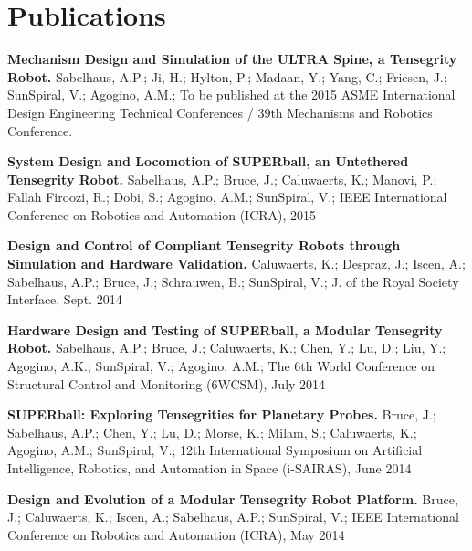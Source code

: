 \documentclass[letterpaper]{deedy-resume} %
\begin{document}
\begin{minipage}[t]{0.66\textwidth}%
\section{Publications}

\vspace{0.4cm}

\begin{tightitemize}

\item \textbf{Mechanism Design and Simulation of the ULTRA Spine, a Tensegrity Robot.} Sabelhaus, A.P.; Ji, H.; Hylton, P.; Madaan, Y.; Yang, C.; Friesen, J.; SunSpiral, V.; Agogino, A.M.; To be published at the 2015 ASME International Design Engineering Technical Conferences / 39th Mechanisms and Robotics Conference.

\item \textbf{System Design and Locomotion of SUPERball, an Untethered Tensegrity Robot.} Sabelhaus, A.P.; Bruce, J.; Caluwaerts, K.; Manovi, P.; Fallah Firoozi, R.; Dobi, S.; Agogino, A.M.; SunSpiral, V.; IEEE International Conference on Robotics and Automation (ICRA), 2015

\item \textbf{Design and Control of Compliant Tensegrity Robots through Simulation and Hardware Validation.} Caluwaerts, K.; Despraz, J.; Iscen, A.; Sabelhaus, A.P.; Bruce, J.; Schrauwen, B.; SunSpiral, V.;  J. of the Royal Society Interface, Sept. 2014

\item \textbf{Hardware Design and Testing of SUPERball, a Modular Tensegrity Robot.} Sabelhaus, A.P.; Bruce, J.; Caluwaerts, K.; Chen, Y.; Lu, D.; Liu, Y.; Agogino, A.K.; SunSpiral, V.; Agogino, A.M.; The 6th World Conference on Structural Control and Monitoring (6WCSM), July 2014

\item \textbf{SUPERball: Exploring Tensegrities for Planetary Probes.} Bruce, J.; Sabelhaus, A.P.; Chen, Y.; Lu, D.; Morse, K.; Milam, S.; Caluwaerts, K.; Agogino, A.M.; SunSpiral, V.; 12th International Symposium on Artificial Intelligence, Robotics, and Automation in Space (i-SAIRAS), June 2014

\item \textbf{Design and Evolution of a Modular Tensegrity Robot Platform.} Bruce, J.; Caluwaerts, K.; Iscen, A.; Sabelhaus, A.P.; SunSpiral, V.; IEEE International Conference on Robotics and Automation (ICRA), May 2014


\end{tightitemize}
\end{minipage}
\end{document}
